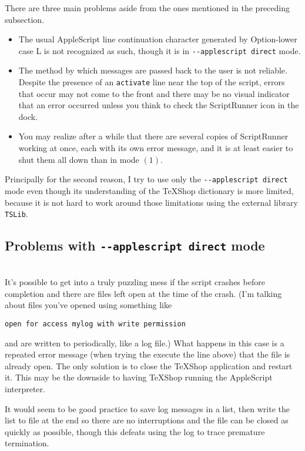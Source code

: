 \documentclass[11pt]{amsart}
\def\TeXShop{\TeX Shop\xspace}
\begin{document}
There are three main problems aside from the ones mentioned in the preceding subsection.
\begin{itemize}
\item
The usual AppleScript line continuation character generated by Option-lower case L is not recognized as such, though it is in {\tt -{}-applescript direct} mode.
\item The method by which messages are passed back to the user is not reliable. Despite the presence of an {\tt activate} line near the top of the script, errors that occur may not come to the front and there may be no visual indicator that an error occurred unless you think to check the ScriptRunner icon in the dock.
\item You may realize after a while that there are several copies of ScriptRunner working at once, each with its own error message, and it is at least easier to shut them all down than in mode $(1)$.
\end{itemize}
Principally for the second reason, I try to use only the {\tt -{}-applescript direct} mode even though its understanding of the \TeXShop dictionary is more limited, because it is not hard to work around those limitations using the external library {\tt TSLib}.

\subsection{Problems with {\tt -{}-applescript direct} mode}\hspace*{1pt}\\[6pt]
It's possible to get into a truly puzzling mess if the script crashes before completion and there are files left open at the time of the crash. (I'm talking about files you've opened using something like
\begin{verbatim}
open for access mylog with write permission
\end{verbatim}
and are written to periodically, like a log file.) What happens in this case is a repeated error message (when trying the execute the line above) that the file is already open. The only solution is to close the \TeXShop application and restart it. This may be the downside to having \TeXShop running the AppleScript interpreter. 

It would seem to be good practice to save log messages in a list, then write the list to file at the end so there are no interruptions and the file can be closed as quickly as possible, though this defeats using the log to trace premature termination. 
\end{document}
